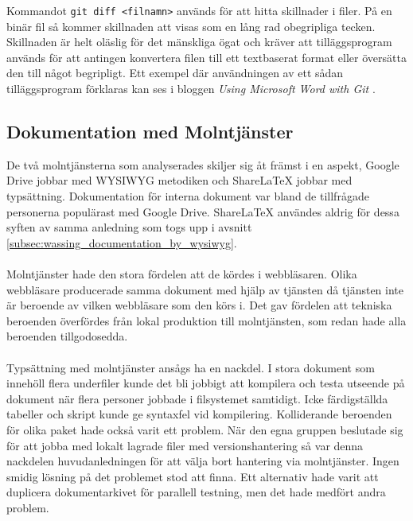Kommandot \texttt{git diff <filnamn>} används för att hitta skillnader i filer. På en binär fil så kommer skillnaden att visas som en lång rad obegripliga tecken.
Skillnaden är helt oläslig för det mänskliga ögat och kräver att tilläggsprogram används för att antingen konvertera filen till ett textbaserat format eller översätta den till något begripligt. Ett exempel där användningen av ett sådan tilläggsprogram förklaras kan ses i bloggen \textit{Using Microsoft Word with Git} \cite{website:using_git_with_word}.

\subsection{Dokumentation med Molntjänster}
De två molntjänsterna som analyserades skiljer sig åt främst i en aspekt, Google Drive jobbar med WYSIWYG metodiken och ShareLaTeX jobbar med typsättning. Dokumentation för interna dokument var bland de tillfrågade personerna populärast med Google Drive. ShareLaTeX användes aldrig för dessa syften av samma anledning som togs upp i avsnitt \ref{subsec:wassing_documentation_by_wysiwyg}. 
\\ \\
Molntjänster hade den stora fördelen att de kördes i webbläsaren. Olika webbläsare producerade samma dokument med hjälp av tjänsten då tjänsten inte är beroende av vilken webbläsare som den körs i. Det gav fördelen att tekniska beroenden överfördes från lokal produktion till molntjänsten, som redan hade alla beroenden tillgodosedda.
\\ \\
Typsättning med molntjänster ansågs ha en nackdel. I stora dokument som innehöll flera underfiler kunde det bli jobbigt att kompilera och testa utseende på dokument när flera personer jobbade i filsystemet samtidigt. Icke färdigställda tabeller och skript kunde ge syntaxfel vid kompilering. Kolliderande beroenden för olika paket hade också varit ett problem. När den egna gruppen beslutade sig för att jobba med lokalt lagrade filer med versionshantering så var denna nackdelen huvudanledningen för att välja bort hantering via molntjänster. Ingen smidig lösning på det problemet stod att finna. Ett alternativ hade varit att duplicera dokumentarkivet för parallell testning, men det hade medfört andra problem.

